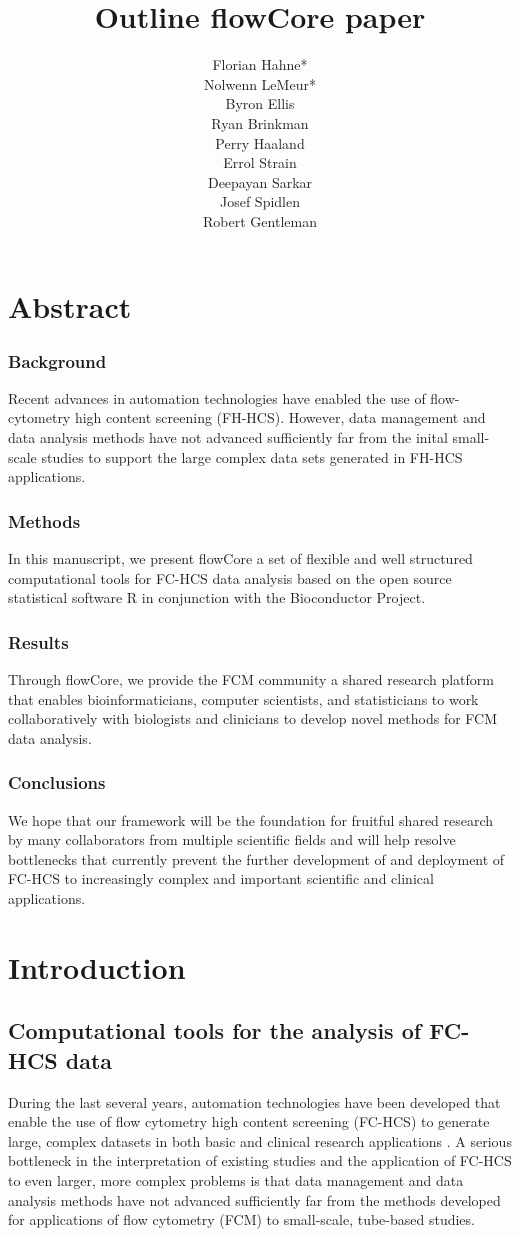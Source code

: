 \documentclass[12pt]{article}
\title{Outline flowCore paper}
\author{Florian Hahne*\\
  Nolwenn LeMeur*\\
  Byron Ellis\\
  Ryan Brinkman\\
  Perry Haaland\\
  Errol Strain\\
  Deepayan Sarkar\\
  Josef Spidlen\\
  Robert Gentleman
 }
\newcommand{\Rpackage}[1]{{\textsf{#1}}}
\begin{document}
\maketitle

\section*{Abstract}
\subsubsection*{Background}
Recent advances in automation technologies have enabled the use of
flow-cytometry high content screening (FH-HCS). However, data
management and data analysis methods have not advanced sufficiently
far from the inital small-scale studies to support the large complex
data sets generated in FH-HCS applications.
\subsubsection*{Methods}
In this manuscript, we present \Rpackage{flowCore} a set of flexible
and well structured computational tools for FC-HCS data analysis based
on the open source statistical software R in conjunction with the
Bioconductor Project.
\subsubsection*{Results}
Through \Rpackage{flowCore}, we provide the FCM community a shared
research platform that enables bioinformaticians, computer scientists,
and statisticians to work collaboratively with biologists and
clinicians to develop novel methods for FCM data analysis.
\subsubsection*{Conclusions}
We hope that our framework will be the foundation for fruitful shared
research by many collaborators from multiple scientific fields and
will help resolve bottlenecks that currently prevent the further
development of and deployment of FC-HCS to increasingly complex and
important scientific and clinical applications.

\section*{Introduction}
\subsection*{Computational tools for the analysis of FC-HCS data}
During the last several years, automation technologies have been
developed that enable the use of flow cytometry high content screening
(FC-HCS) to generate large, complex datasets in both basic and
clinical research applications \citep{brinkman2007hcf}. A serious
bottleneck in the interpretation of existing studies and the
application of FC-HCS to even larger, more complex problems is that
data management and data analysis methods have not advanced
sufficiently far from the methods developed for applications of flow
cytometry (FCM) to small-scale, tube-based studies.
\end{document}
